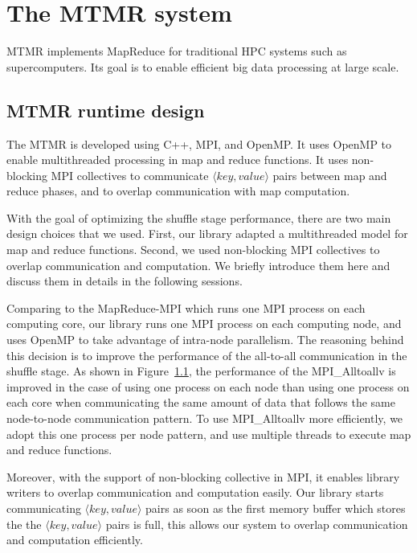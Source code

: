 \section{The MTMR system}
MTMR implements MapReduce for traditional HPC systems such as 
supercomputers. Its goal is to enable efficient big data processing
at large scale.


\subsection{MTMR runtime design}

The MTMR is developed using C++, MPI, and OpenMP. It uses OpenMP to
enable multithreaded processing in map and reduce functions. It uses 
non-blocking MPI collectives to communicate $\langle key, value \rangle$ pairs 
between map and reduce phases, and to overlap communication
with map computation. 

With the goal of optimizing the shuffle stage performance,
there are two main design choices that we used. First, our library adapted
a multithreaded model for map and reduce functions. Second, 
we used non-blocking MPI collectives to overlap communication
and computation. We briefly introduce them here and discuss them in
details in the following sessions.

Comparing to the MapReduce-MPI which runs one MPI process
on each computing core, our library runs one MPI process on each
computing node, and uses OpenMP to take advantage of intra-node
parallelism. The reasoning behind this decision is to improve
the performance of the all-to-all communication in the shuffle stage.
As shown in Figure~\ref{}, the performance of the MPI\_Alltoallv 
is improved in the case of using one process on each node than 
using one process on each core when communicating the same
amount of data that follows the same node-to-node communication
pattern. To use MPI\_Alltoallv more efficiently, we adopt this one
process per node pattern, and use multiple threads to execute map
and reduce functions.

Moreover, with the support of non-blocking collective in MPI, it
enables library writers to overlap communication and computation 
easily. Our library starts communicating $\langle key, value \rangle$ pairs 
as soon as the first memory buffer which stores the the $\langle key, value \rangle$
pairs is full, this allows our system to overlap communication
and computation efficiently.

